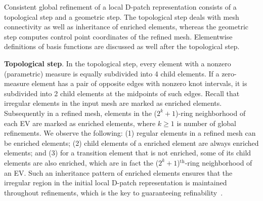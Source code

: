 \documentclass[graybox]{svmult}
\begin{document}
Consistent global refinement of a local D-patch representation consists of a topological step and a geometric step. The topological step deals with mesh connectivity as well as inheritance of enriched elements, whereas the geometric step computes control point coordinates of the refined mesh. Elementwise definitions of basis functions are discussed as well after the topological step.

\vspace{+2mm}\noindent\textbf{Topological step}.
In the topological step, every element with a nonzero (parametric) measure is equally subdivided into 4 child elements. If a zero-measure element has a pair of opposite edges with nonzero knot intervals, it is subdivided into 2 child elements at the midpoints of such edges. Recall that irregular elements in the input mesh are marked as enriched elements. Subsequently in a refined mesh, elements in the ($2^k+1$)-ring neighborhood of each EV are marked as enriched elements, where $k\geq 1$ is number of global refinements. We observe the following: (1) regular elements in a refined mesh can be enriched elements; (2) child elements of a enriched element are always enriched elements; and (3) for a transition element that is not enriched, some of its child elements are also enriched, which are in fact the ($2^k+1$)$^{\text{th}}$-ring neighborhood of an EV. Such an inheritance pattern of enriched elements ensures that the irregular region in the initial local D-patch representation is maintained throughout refinements, which is the key to guaranteeing refinability~\cite{ref:toshniwal17}.
\end{document}
